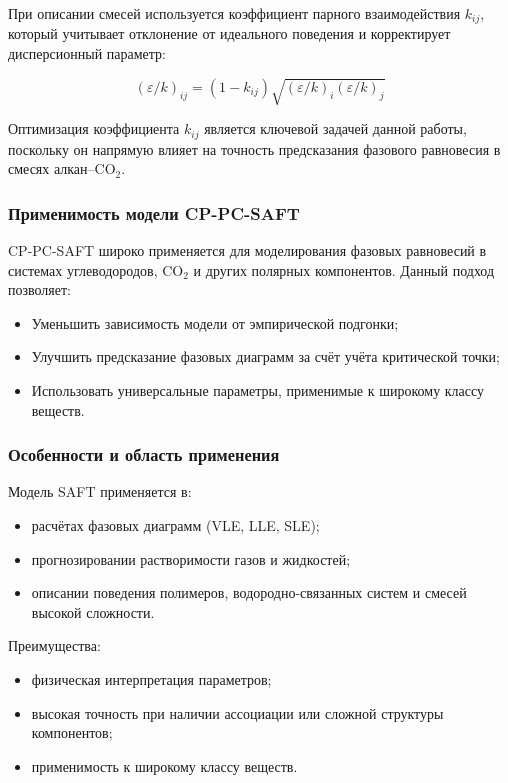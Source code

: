 \documentclass[a4paper,12pt]{article}
\begin{document}
При описании смесей используется коэффициент парного взаимодействия \( k_{ij} \), который учитывает отклонение от идеального поведения и корректирует дисперсионный параметр:

\begin{equation}
	(\varepsilon/k)_{ij} = (1 - k_{ij}) \sqrt{(\varepsilon/k)_i (\varepsilon/k)_j}
\end{equation}

Оптимизация коэффициента \( k_{ij} \) является ключевой задачей данной работы, поскольку он напрямую влияет на точность предсказания фазового равновесия в смесях алкан–$\mathrm{CO}_2$.

\subsubsection{Применимость модели CP-PC-SAFT}

CP-PC-SAFT широко применяется для моделирования фазовых равновесий в системах углеводородов, $\mathrm{CO}_{2}$ и других полярных компонентов. Данный подход позволяет:
\begin{itemize}
    \item Уменьшить зависимость модели от эмпирической подгонки;
    \item Улучшить предсказание фазовых диаграмм за счёт учёта критической точки;
    \item Использовать универсальные параметры, применимые к широкому классу веществ.
\end{itemize}

\subsubsection{Особенности и область применения}

Модель SAFT применяется в:
\begin{itemize}
    \item расчётах фазовых диаграмм (VLE, LLE, SLE);
    \item прогнозировании растворимости газов и жидкостей;
    \item описании поведения полимеров, водородно-связанных систем и смесей высокой сложности.
\end{itemize}

Преимущества:
\begin{itemize}
    \item физическая интерпретация параметров;
    \item высокая точность при наличии ассоциации или сложной структуры компонентов;
    \item применимость к широкому классу веществ.
\end{itemize}
\end{document}
